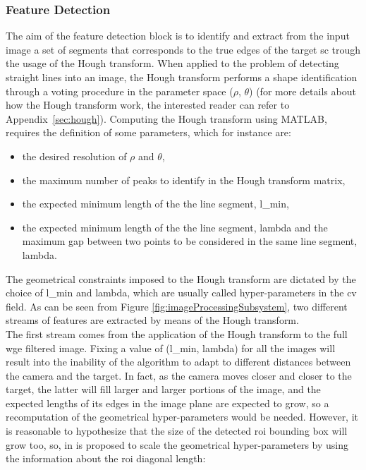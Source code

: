 \subsubsection{Feature Detection}\label{sec:featureextraction}
The aim of the feature detection block is to  identify and extract from the input image a set of segments that corresponds to the true edges of the target \acrshort{sc} trough the usage of the Hough transform. When applied to the problem of detecting straight lines into an image, the Hough transform performs a shape identification through a voting procedure in the parameter space ($\rho$, $\theta$) (for more details about how the Hough transform work, the interested reader can refer to Appendix~\ref{sec:hough}). Computing the Hough transform using MATLAB, requires the definition of some parameters, which for instance are:

\begin{itemize}
  \item the desired resolution of $\rho$ and $\theta$,
  \item the maximum number of peaks to identify in the Hough transform matrix,
  \item the expected minimum length of the the line segment, \gls{l_min},
  \item the expected minimum length of the the line segment, \gls{lambda} and the maximum gap between two points to be considered in the same line segment, \gls{lambda}.
\end{itemize}

The geometrical constraints imposed to the Hough transform are dictated by the choice of \gls{l_min} and \gls{lambda}, which are usually called hyper-parameters in the \acrshort{cv} field. As can be seen from Figure \ref{fig:imageProcessingSubsystem}, two different streams of features are extracted by means of the Hough transform.\\
The first stream comes from the application of the Hough transform to the full \acrshort{wge} filtered image. Fixing a value of (\gls{l_min}, \gls{lambda}) for all the images will result into the inability of the algorithm to adapt to different distances between the camera and the target. In fact, as the camera moves closer and closer to the target, the latter will fill larger and larger portions of the image, and the expected lengths of its edges in the image plane are expected to grow, so a recomputation of the geometrical hyper-parameters would be needed. However, it is reasonable to hypothesize that the size of the detected \acrshort{roi} bounding box will grow too, so, in \cite{Sharma2018} is proposed to scale the geometrical hyper-parameters by using the information about the \acrshort{roi} diagonal length:

